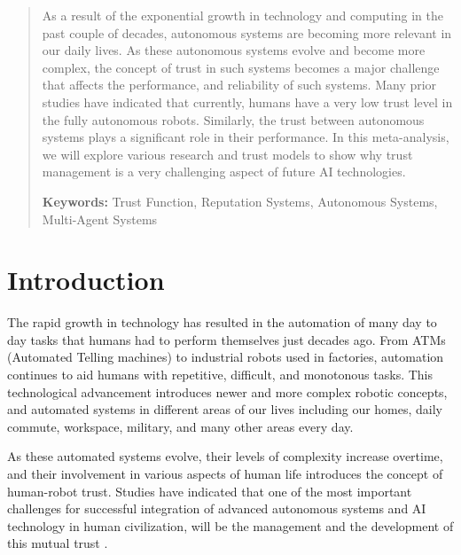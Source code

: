 \documentclass[runningheads,a4paper]{llncs}
\begin{document}
\maketitle
\begin{abstract}

\noindent As a result of the exponential growth in technology and computing in the past couple of decades, autonomous systems are becoming more relevant in our daily lives. As these autonomous systems evolve and become more complex, the concept of trust in such systems becomes a major challenge that affects the performance, and reliability of such systems. Many prior studies have indicated that currently, humans have a very low trust level in the fully autonomous robots. Similarly, the trust between autonomous systems plays a significant role in their performance. In this meta-analysis, we will explore various research and trust models to show why trust management is a very challenging aspect of future AI technologies.

\vspace{10pt}
\textbf{Keywords:} Trust Function, Reputation Systems, Autonomous Systems, Multi-Agent Systems
\end{abstract}


\section{Introduction} 
\label{ShervinTrustSurvey_introduction}
The rapid growth in technology has resulted in the automation of many day to day tasks that humans had to perform themselves just decades ago. From ATMs (Automated Telling machines) to industrial robots used in factories, automation continues to aid humans with repetitive, difficult, and monotonous tasks. This technological advancement introduces newer and more complex robotic concepts, and automated systems in different areas of our lives including our homes, daily commute, workspace, military, and many other areas every day.

As these automated systems evolve, their levels of complexity increase overtime, and their involvement in various aspects of human life introduces the concept of human-robot trust. Studies have indicated that one of the most important challenges for successful integration of advanced autonomous systems and AI technology in human civilization, will be the management and the development of this mutual trust \cite{beer2014toward}.
\end{document}
